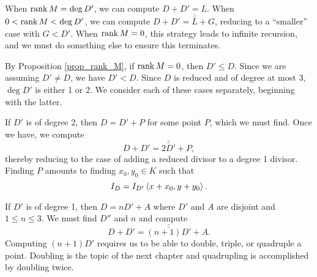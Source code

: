 When $\operatorname{rank} M = \deg D'$, we can compute $D + D' = L$.
When $0 < \operatorname{rank} M < \deg D'$, we can compute $D + D' = \bar{\bar L} + G$, reducing to a ``smaller'' case with $G < D'$.
When $\operatorname{rank} M = 0$, this strategy leads to infinite recursion, and we must do something else to ensure this terminates.





By Proposition \ref{prop_rank_M}, if $\operatorname{rank} M = 0$, then $D' \leq D$.
Since we are assuming $D' \neq D$, we have $D' < D$.
Since $D$ is reduced and of degree at most 3, $\deg D'$ is either 1 or 2.
We consider each of these cases separately, beginning with the latter.

If $D'$ is of degree 2, then $D = D' + P$ for some point $P$, which we must find.
Once we have, we compute
  \[ D + D' = \bar{\bar{2D'}} + P, \]
thereby reducing to the case of adding a reduced divisor to a degree 1 divisor.
Finding $P$ amounts to finding $x_0, y_0 \in K$ such that
  \[ I_D = I_{D'}\left\langle x + x_0, y + y_0 \right\rangle. \]

If $D'$ is of degree 1, then $D = nD' + A$ where $D'$ and $A$ are disjoint and $1 \leq n \leq 3$.
We must find $D''$ and $n$ and compute
  \[ D + D' = \bar{\bar{(n + 1)D'}} + A. \]
Computing $(n + 1)D'$ requires us to be able to double, triple, or quadruple a point.
Doubling is the topic of the next chapter and quadrupling is accomplished by doubling twice.


